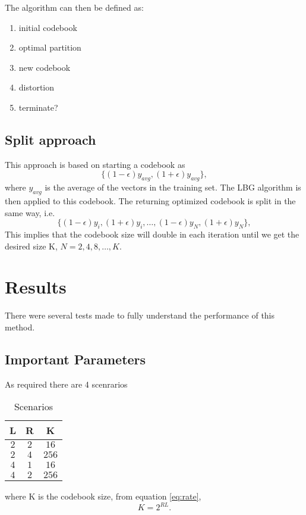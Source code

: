 \documentclass[a4paper, 11pt]{article}
\begin{document}
			The algorithm can then be defined as:
			\begin{enumerate}
				\item initial codebook
				\item optimal partition
				\item new codebook
				\item distortion
				\item terminate?
			\end{enumerate}
		
		\subsection{Split approach}
				This approach is based on starting a codebook as 
				\begin{equation}
					\{(1-\epsilon)y_{avg}, (1+\epsilon)y_{avg}\},
				\end{equation}
				where $ y_{avg} $ is the average of the vectors in the training set.
				The LBG algorithm is then applied to this codebook.
				The returning optimized codebook is split in the same way, i.e.
				\begin{equation}
					\{(1-\epsilon)y_i, (1+\epsilon)y_i, \ldots, (1-\epsilon)y_N, (1+\epsilon)y_N \}, 
				\end{equation}
				This implies that the codebook size will double in each iteration until we get the desired size K, $ N=2,4,8, \ldots,K $.			
		
	
	\section{Results}
		There were several tests made to fully understand the performance of this method.
		
		\subsection{Important Parameters}
			As required there are 4 scenrarios
			\begin{table}[H]
				\centering
				\begin{tabular}{c|c|c}
					\textbf{L} 		& \textbf{R} 	& \textbf{K} 	\\ \hline
					$ 2 $			& $ 2 $ 		& $ 16 $	  	\\ \hline
					$ 2 $			& $ 4 $ 	  	& $ 256 $ 		\\ \hline	
					$ 4 $			& $ 1 $ 		& $ 16 $ 		\\ \hline	
					$ 4 $			& $ 2 $			& $	256 $ 		\\
				\end{tabular}
				\caption{Scenarios}
				\label{table:Scenarios}
			\end{table}
			where K is the codebook size, from equation \ref{eq:rate},
			\begin{equation}
				K = 2^{RL}.
			\end{equation} 
		
\end{document}
